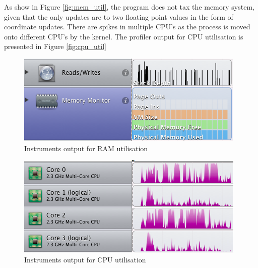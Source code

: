 \documentclass[a4paper,12pt, twocolumn]{article}
\newenvironment{changemargin}[2]{\begin{list}{}{%
\setlength{\topsep}{0pt}%
\setlength{\leftmargin}{0pt}%
\setlength{\rightmargin}{0pt}%
\setlength{\listparindent}{\parindent}%
\setlength{\itemindent}{\parindent}%
\setlength{\parsep}{0pt plus 1pt}%
\addtolength{\leftmargin}{#1}%
\addtolength{\rightmargin}{#2}%
}\item }{\end{list}}
\begin{document}
As show in Figure \ref{fig:mem_util}, the program does not tax the memory system, given that the only updates are to two floating point values in the form of coordinate updates.
There are spikes in multiple CPU's as the process is moved onto different CPU's by the kernel. The profiler output for CPU utilisation is presented in Figure \ref{fig:cpu_util}
\begin{figure}[!h]
\begin{changemargin}{-20mm}{-20mm}
\center
\includegraphics[scale=0.4]{mem_util.png}
\caption{Instruments output for RAM utilisation}
\end{changemargin}
\end{figure}

\begin{figure}[!h]
\begin{changemargin}{-20mm}{-20mm}
\center
\includegraphics[scale=0.4]{cpu_util.png}
\caption{Instruments output for CPU utilisation}
\end{changemargin}
\end{figure}
\end{document}
